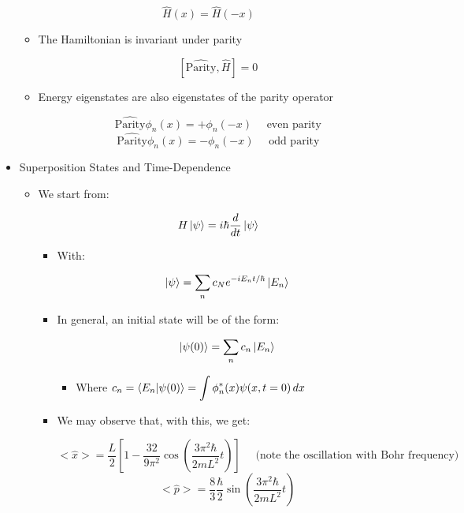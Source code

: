 \begin{itemize}
    $$\hat{H}(x)=\hat{H}(-x)$$

    \begin{itemize}

      \item The Hamiltonian is invariant under parity

        $$[\hat{\text{Parity}},\hat{H}]=0$$

      \item Energy eigenstates are also eigenstates of the parity operator

        $$\hat{\text{Parity}}\phi_n(x)=+\phi_n(-x)\quad \text{ even parity}$$
        $$\hat{\text{Parity}}\phi_n(x)=-\phi_n(-x)\quad \text{ odd parity}$$

    \end{itemize}

  \item Superposition States and Time-Dependence

    \begin{itemize}

      \item We start from:

        $$H\ket{\psi}=i\hbar\frac{d}{dt}\ket{\psi}$$

        \begin{itemize}

          \item With:

            $$\ket{\psi}=\sum_n c_Ne^{-iE_nt/\hbar}\ket{E_n}$$

          \item In general, an initial state will be of the form:

            $$\ket{\psi(0)}=\sum_nc_n\ket{E_n}$$
            
            \begin{itemize}

              \item Where $c_n=\bra{E_n}\ket{\psi(0)}=\displaystyle \int \phi^*_n(x)\psi(x,t=0)\,dx$

            \end{itemize}
          
          \item We may observe that, with this, we get:

            $$<\hat{x}>=\frac{L}{2}\left[ 1-\frac{32}{9\pi^2}\cos\left( \frac{3\pi^2\hbar}{2mL^2}t \right) \right]\quad \text{ (note the oscillation with Bohr frequency)}$$
            $$<\hat{p}>=\frac{8}{3}\frac{\hbar}{2}\sin\left( \frac{3\pi^2\hbar}{2mL^2}t \right)$$


\end{itemize}
\end{itemize}
\end{itemize}

